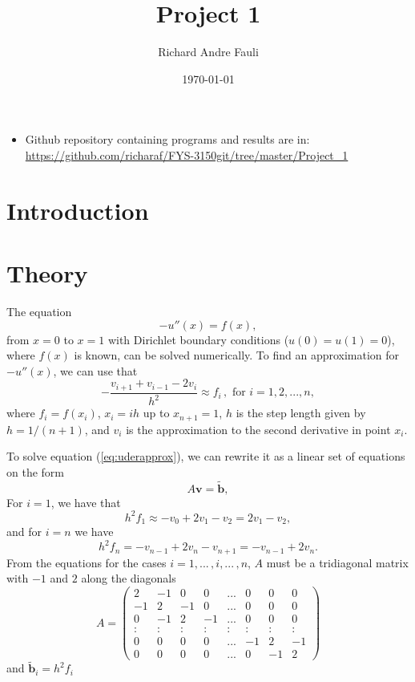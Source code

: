 \documentclass[norsk,a4paper,12pt]{article}
\title{Project 1}
\author{Richard Andre Fauli}
\date{\today}
\begin{document}
\maketitle

\begin{abstract}
\end{abstract}
\begin{itemize}
\item Github repository containing programs and results are in: \url{https://github.com/richaraf/FYS-3150git/tree/master/Project_1}
\end{itemize}
\section{Introduction}

\section{Theory}

The equation
\begin{equation}
-u''(x) = f(x),
\label{eq:udereqf}
\end{equation}
from $x=0$ to $x=1$ with Dirichlet boundary conditions ($u(0)=u(1)=0$), where $f(x)$ is known, can be solved numerically. To find an approximation for $-u''(x)$, we can use that
\begin{equation}
-\frac{v_{i+1}+v_{i-1} - 2v_i}{h^2} \approx f_i\, , \text{ for } i = 1, 2, ..., n,
\label{eq:uderapprox}
\end{equation}
where $f_i=f(x_i)$, $x_i = ih$ up to $x_{n+1} = 1$, $h$ is the step length given by $h=1/(n+1)$, and $v_i$ is the approximation to the second derivative in point $x_i$. 

To solve equation (\ref{eq:uderapprox}), we can rewrite it as a linear set of equations on the form \begin{equation}
A\textbf{v} = \tilde{\textbf{b}},
\label{eq:Aveqb}
\end{equation} For $i=1$, we have that 
$$h^2f_1 \approx -v_0 + 2v_1 - v_2 = 2v_1-v_2,$$
and for $i=n$ we have 
$$h^2f_n = -v_{n-1} + 2v_n - v_{n+1} = -v_{n-1} + 2v_n.$$ From the equations for the cases $i=1,...\,,i,...\,,n$, $A$ must be a tridiagonal matrix with $-1$ and $2$ along the diagonals
$$A = \begin{pmatrix}
2&-1&0&0&...&0&0&0\\
-1&2&-1&0&...&0&0&0\\
0&-1&2&-1&...&0&0&0\\
:&:&:&:& : &:&:&:\\
0&0&0&0&...&-1&2&-1\\
0&0&0&0&...&0&-1&2
\end{pmatrix}$$
and $\tilde{\textbf{b}}_i = h^2f_i$
\end{document}
